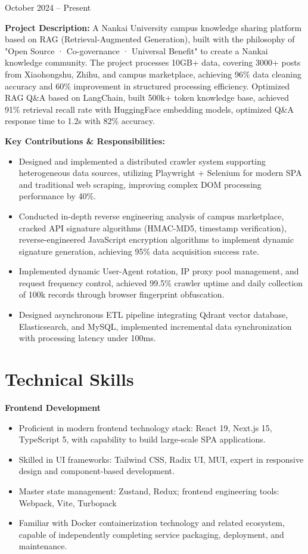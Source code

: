\documentclass{resume}
\begin{document}
 {October 2024 -- Present}

\textbf{Project Description:}
A Nankai University campus knowledge sharing platform based on RAG (Retrieval-Augmented Generation), built with the philosophy of "Open Source · Co-governance · Universal Benefit" to create a Nankai knowledge community. The project processes 10GB+ data, covering 3000+ posts from Xiaohongshu, Zhihu, and campus marketplace, achieving 96\% data cleaning accuracy and 60\% improvement in structured processing efficiency. Optimized RAG Q\&A based on LangChain, built 500k+ token knowledge base, achieved 91\% retrieval recall rate with HuggingFace embedding models, optimized Q\&A response time to 1.2s with 82\% accuracy.

\textbf{Key Contributions \& Responsibilities:}
\begin{itemize}
    \item Designed and implemented a distributed crawler system supporting heterogeneous data sources, utilizing Playwright + Selenium for modern SPA and traditional web scraping, improving complex DOM processing performance by 40\%.
    \item Conducted in-depth reverse engineering analysis of campus marketplace, cracked API signature algorithms (HMAC-MD5, timestamp verification), reverse-engineered JavaScript encryption algorithms to implement dynamic signature generation, achieving 95\% data acquisition success rate.
    \item Implemented dynamic User-Agent rotation, IP proxy pool management, and request frequency control, achieved 99.5\% crawler uptime and daily collection of 100k records through browser fingerprint obfuscation.
    \item Designed asynchronous ETL pipeline integrating Qdrant vector database, Elasticsearch, and MySQL, implemented incremental data synchronization with processing latency under 100ms.
\end{itemize}

\vspace{-2ex}
\section{Technical Skills}
\textbf{Frontend Development}
    \begin{itemize}
        \item Proficient in modern frontend technology stack: React 19, Next.js 15, TypeScript 5, with capability to build large-scale SPA applications.
        \item Skilled in UI frameworks: Tailwind CSS, Radix UI, MUI, expert in responsive design and component-based development.
        \item Master state management: Zustand, Redux; frontend engineering tools: Webpack, Vite, Turbopack
        \item Familiar with Docker containerization technology and related ecosystem, capable of independently completing service packaging, deployment, and maintenance.
    \end{itemize}
    
\end{document}
